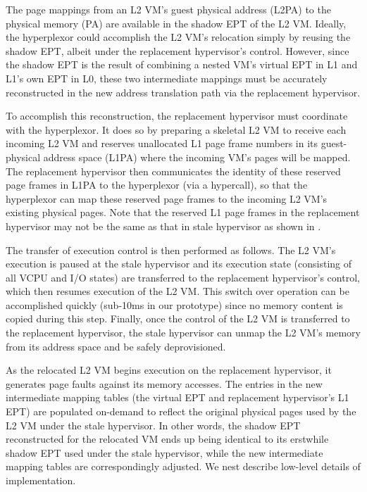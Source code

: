 The page mappings from an L2 VM's guest physical address (L2PA) to the physical memory (PA) are
available in the shadow EPT of the L2 VM. 
Ideally, the hyperplexor could accomplish the L2 VM's relocation
simply by reusing the shadow EPT, albeit under the replacement hypervisor's control.
However, since the shadow EPT is the result of combining a nested
VM's virtual EPT in L1 and L1's own EPT in L0, these two intermediate mappings 
must be accurately reconstructed in the new address translation path via 
the replacement hypervisor. 

To accomplish this reconstruction, the replacement hypervisor must coordinate 
with the hyperplexor.
It does so by preparing a skeletal L2 VM to receive each incoming L2 VM
and reserves unallocated L1 page frame numbers in its guest-physical address space (L1PA) 
where the incoming VM's pages will be mapped. 
The replacement hypervisor then communicates the identity of these reserved page frames 
in L1PA to the hyperplexor (via a hypercall), so that the hyperplexor
can map these reserved page frames to the incoming L2 VM's existing physical pages.
Note that the reserved L1 page frames in the replacement hypervisor may not be the same as 
that in stale hypervisor as shown in . 

The transfer of execution control is then  performed as follows.
The L2 VM's execution is paused at the stale hypervisor
and its execution state (consisting of all VCPU and I/O states) 
are transferred to the replacement hypervisor's control, which then resumes execution 
of the L2 VM. This switch over operation can be accomplished quickly 
(sub-10ms in our prototype) since no memory content is copied during this step.
Finally, once the control of the L2 VM is transferred to the replacement hypervisor, 
the stale hypervisor can unmap the L2 VM's  memory from its address space and be safely deprovisioned. 

As the relocated L2 VM begins execution on the replacement hypervisor,
it generates page faults against its memory accesses.
The entries in the new intermediate mapping tables (the virtual EPT and replacement hypervisor's 
L1 EPT) are populated on-demand to reflect the original physical 
pages used by the L2 VM under the stale hypervisor. 
In other words, the shadow EPT reconstructed for the relocated
VM ends up being identical to its erstwhile shadow EPT used under the stale hypervisor, while 
the new intermediate mapping tables are correspondingly adjusted.
We nest describe low-level details of \arch implementation.



